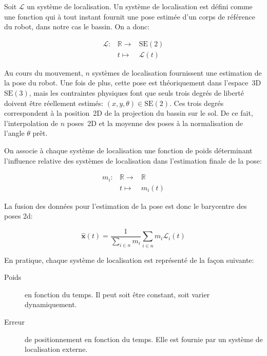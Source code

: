 Soit $\mathcal{L}$ un système de localisation. Un système de
localisation est défini comme une fonction qui à tout instant fournit
une pose estimée d'un corps de référence du robot, dans notre cas le
bassin. On a donc:

\begin{equation}
  \begin{array}{ccc}
    \mathcal{L} : & \mathbb{R} \rightarrow & \text{SE}(2)\\
      & t \mapsto & \mathcal{L}(t)
  \end{array}
\end{equation}

Au cours du mouvement, $n$ systèmes de localisation fournissent une
estimation de la pose du robot. Une fois de plus, cette pose est
théoriquement dans l'espace 3D $\text{SE}(3)$, mais les contraintes
physiques font que seuls trois degrés de liberté doivent être
réellement estimés: $(x, y, \theta) \in \text{SE}(2)$. Ces trois
degrés correspondent à la position 2D de la projection du bassin sur
le sol. De ce fait, l'interpolation de $n$ poses 2D et la moyenne des
poses à la normalisation de l'angle $\theta$ prêt.


On associe à chaque système de localisation une fonction de poids
déterminant l'influence relative des systèmes de localisation dans
l'estimation finale de la pose:

\begin{equation}
  \begin{array}{ccc}
    m_i : & \mathbb{R} \rightarrow & \mathbb{R}\\
      & t \mapsto & m_i(t)
  \end{array}
\end{equation}

La fusion des données pour l'estimation de la pose est donc le
barycentre des poses 2d:

\begin{equation}
  \mathbf{\hat{x}}(t) = \frac{1}{\sum_{i \in n} m_i} \sum_{i \in n} m_i \mathcal{L}_i(t)
\end{equation}

En pratique, chaque système de localisation est représenté de la façon suivante:
\begin{description}
\item[Poids] en fonction du temps. Il peut soit être constant, soit
  varier dynamiquement.
\item[Erreur] de positionnement en fonction du temps. Elle est fournie
  par un système de localisation externe.
\end{description}


